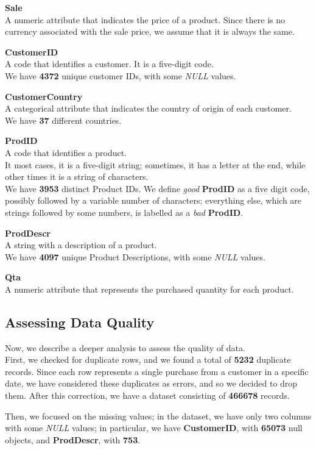 \textbf{Sale}\\
A numeric attribute that indicates the price of a product.
Since there is no currency associated with the sale price, we assume that it is always the same.

\textbf{CustomerID}\\
A code that identifies a customer. It is a five-digit code.\\
We have \textbf{4372} unique customer IDs, with some \emph{NULL} values.

\textbf{CustomerCountry}\\
A categorical attribute that indicates the country of origin of each customer.\\
We have \textbf{37} different countries.

\textbf{ProdID}\\
A code that identifies a product.\\
It most cases, it is a five-digit string; sometimes, it has a letter at the end, while other times it is a string of characters.\\
We have \textbf{3953} distinct Product IDs.
We define \emph{good} \textbf{ProdID} as a five digit code, possibly followed by a variable number of characters; everything else, which are strings followed by some numbers, is labelled as a \emph{bad} \textbf{ProdID}.

\textbf{ProdDescr}\\  
A string with a description of a product.\\
We have \textbf{4097} unique Product Descriptions, with some \emph{NULL} values.

\textbf{Qta}\\
A numeric attribute that represents the purchased quantity for each product.

\subsection{Assessing Data Quality}
Now, we describe a deeper analysis to assess the quality of data.\\
First, we checked for duplicate rows, and we found a total of \textbf{5232} duplicate records. Since each row represents a single purchase from a customer in a specific date, we have considered these duplicates as errors, and so we decided to drop them. After this correction, we have a dataset consisting of \textbf{466678} records.

Then, we focused on the missing values; in the dataset, we have only two columns with some \emph{NULL} values; in particular, we have \textbf{CustomerID}, with \textbf{65073} null objects, and \textbf{ProdDescr}, with \textbf{753}.

